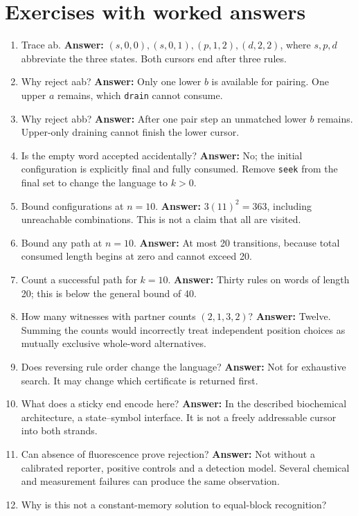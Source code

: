 \section{Exercises with worked answers}
\begin{enumerate}
\item Trace ab. \textbf{Answer:} $(s,0,0),(s,0,1),(p,1,2),(d,2,2)$,
where $s,p,d$ abbreviate the three states. Both cursors end after three rules.
\item Why reject aab? \textbf{Answer:} Only one lower $b$ is available for
pairing. One upper $a$ remains, which \texttt{drain} cannot consume.
\item Why reject abb? \textbf{Answer:} After one pair step an unmatched
lower $b$ remains. Upper-only draining cannot finish the lower cursor.
\item Is the empty word accepted accidentally? \textbf{Answer:} No; the
initial configuration is explicitly final and fully consumed. Remove
\texttt{seek} from the final set to change the language to $k>0$.
\item Bound configurations at $n=10$. \textbf{Answer:} $3(11)^2=363$,
including unreachable combinations. This is not a claim that all are visited.
\item Bound any path at $n=10$. \textbf{Answer:} At most 20 transitions,
because total consumed length begins at zero and cannot exceed 20.
\item Count a successful path for $k=10$. \textbf{Answer:} Thirty rules
on words of length 20; this is below the general bound of 40.
\item How many witnesses with partner counts $(2,1,3,2)$?
\textbf{Answer:} Twelve. Summing the counts would incorrectly treat independent
position choices as mutually exclusive whole-word alternatives.
\item Does reversing rule order change the language? \textbf{Answer:} Not
for exhaustive search. It may change which certificate is returned first.
\item What does a sticky end encode here? \textbf{Answer:} In the described
biochemical architecture, a state--symbol interface. It is not a freely
addressable cursor into both strands.
\item Can absence of fluorescence prove rejection? \textbf{Answer:} Not
without a calibrated reporter, positive controls and a detection model.
Several chemical and measurement failures can produce the same observation.
\item Why is this not a constant-memory solution to equal-block recognition?

\end{enumerate}
